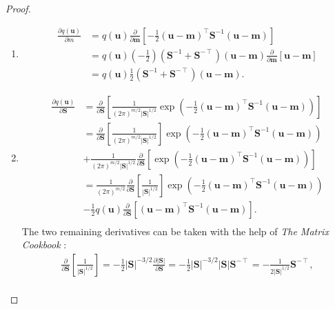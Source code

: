 \documentclass{article}
\theoremstyle{definition}
\newcommand{\dm}{\frac{\partial}{\partial\mathbf{m}}}
\newcommand{\dS}{\frac{\partial}{\partial\mathbf{S}}}
\begin{document}
\begin{proof}
  \leavevmode
  \begin{enumerate}
  \item
    \[
      \begin{split}
        \frac{\partial q(\mathbf{u})}{\partial m} &=
        q(\mathbf{u})\dm\left[-\frac{1}{2}(\mathbf{u} -
          \mathbf{m})^\intercal\mathbf{S}^{-1}(\mathbf{u} - \mathbf{m})\right]
        \\
        &= q(\mathbf{u})\left(-\frac{1}{2}\right)(\mathbf{S}^{-1} +
        \mathbf{S}^{-\intercal})(\mathbf{u} - \mathbf{m})\dm[\mathbf{u} -
        \mathbf{m}] \\
        &= q(\mathbf{u})\frac{1}{2}(\mathbf{S}^{-1} +
        \mathbf{S}^{-\intercal})(\mathbf{u} - \mathbf{m}).
      \end{split}
    \]
  \item
    \[
      \begin{split}
        \frac{\partial q(\mathbf{u})}{\partial \mathbf{S}} &=
        \dS\left[\frac{1}{(2\pi)^{m/2}|\mathbf{S}|^{1/2}}\exp \left( -\frac{1}{2}
            (\mathbf{u} - \mathbf{m})^\intercal\mathbf{S}^{-1}(\mathbf{u} -
            \mathbf{m})\right)\right] \\
        &= \dS\left[\frac{1}{(2\pi)^{m/2}|\mathbf{S}|^{1/2}}\right]\exp \left( -\frac{1}{2}
          (\mathbf{u} - \mathbf{m})^\intercal\mathbf{S}^{-1}(\mathbf{u} -
          \mathbf{m})\right) \\
        &+ \frac{1}{(2\pi)^{m/2}|\mathbf{S}|^{1/2}}\dS\left[\exp\left( -\frac{1}{2}
            (\mathbf{u} - \mathbf{m})^\intercal\mathbf{S}^{-1}(\mathbf{u} -
            \mathbf{m})\right)\right] \\
        &=
        \frac{1}{(2\pi)^{m/2}}\dS\left[\frac{1}{|\mathbf{S}|^{1/2}}\right]\exp
        \left( -\frac{1}{2} (\mathbf{u} -
          \mathbf{m})^\intercal\mathbf{S}^{-1}(\mathbf{u} - \mathbf{m})\right) \\
        &- \frac{1}{2}q(\mathbf{u})\dS[(\mathbf{u}
        - \mathbf{m})^\intercal\mathbf{S}^{-1}(\mathbf{u} - \mathbf{m})]. \\
      \end{split}
    \]
    The two remaining derivatives can be taken with the help of \emph{The Matrix
      Cookbook} \cite{petersen2008matrix}:
    \begin{gather*}
      \dS\left[\frac{1}{|\mathbf{S}|^{1/2}}\right] =
      -\frac{1}{2}|\mathbf{S}|^{-3/2}\frac{\partial |\mathbf{S}|}{\partial \mathbf{S}} =
      -\frac{1}{2}|\mathbf{S}|^{-3/2}|\mathbf{S}|\mathbf{S}^{-\intercal} = -\frac{1}{2|\mathbf{S}|^{1/2}}\mathbf{S}^{-\intercal}, \\

\end{gather*}
\end{enumerate}
\end{proof}
\end{document}
